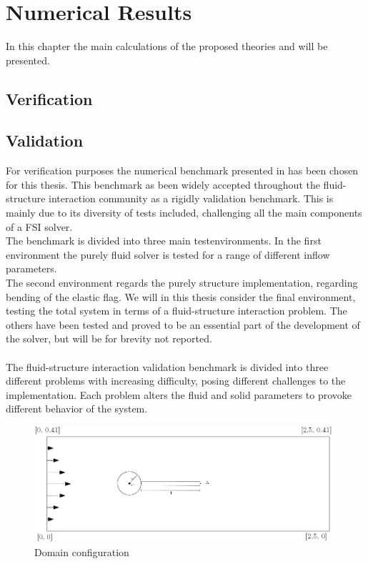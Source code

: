 \chapter{Numerical Results}

In this chapter the main calculations of the proposed theories and will be presented. 

\section{Verification}

\section{Validation}
For verification purposes the numerical benchmark presented in \cite{Hron2006} has been chosen for this thesis. This benchmark as been widely accepted throughout the fluid-structure interaction community as a rigidly validation benchmark. This is mainly due to its diversity of tests included, challenging all the main components of a FSI solver. \\
The benchmark is divided into three main testenvironments.
In the first environment the purely fluid solver is tested for a range of different inflow parameters. \\
The second environment regards the purely structure implementation, regarding bending of the elastic flag. We will in this thesis consider the final environment, testing the total system in terms of a fluid-structure interaction problem. The others have been tested and proved to be an essential part of the development of the solver, but will be for brevity not reported. \\ \\

The fluid-structure interaction validation benchmark is divided into three different problems with increasing difficulty, posing different challenges to the implementation. 
Each problem alters the fluid and solid parameters to provoke different behavior of the system.

\begin{figure}
  \caption{Domain configuration}
  \centering
    \includegraphics[scale=0.5]{./Fig/turekflag.png}
\end{figure}

